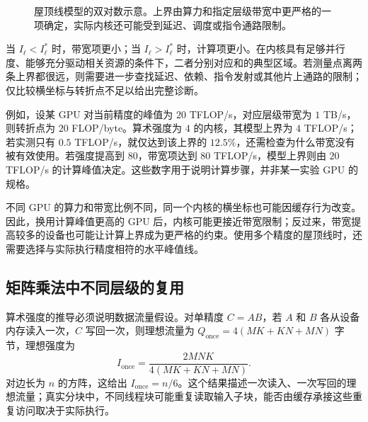 \begin{figure}[htbp]
\centering
{}
\caption{屋顶线模型的双对数示意。上界由算力和指定层级带宽中更严格的一项确定，实际内核还可能受到延迟、调度或指令通路限制。}
\label{l14:fig:roofline-model}
\end{figure}

当 $I_\ell<I_\ell^*$ 时，带宽项更小；当 $I_\ell>I_\ell^*$ 时，计算项更小。在内核具有足够并行度、能够充分驱动相关资源的条件下，二者分别对应和的典型区域。若测量点离两条上界都很远，则需要进一步查找延迟、依赖、指令发射或其他片上通路的限制；仅比较横坐标与转折点不足以给出完整诊断。

例如，设某 GPU 对当前精度的峰值为 $20$ TFLOP/s，对应层级带宽为 $1$ TB/s，则转折点为 $20$ FLOP/byte。算术强度为 $4$ 的内核，其模型上界为 $4$ TFLOP/s；若实测只有 $0.5$ TFLOP/s，就仅达到该上界的 $12.5\%$，还需检查为什么带宽没有被有效使用。若强度提高到 $80$，带宽项达到 $80$ TFLOP/s，模型上界则由 $20$ TFLOP/s 的计算峰值决定。这些数字用于说明计算步骤，并非某一实验 GPU 的规格。

不同 GPU 的算力和带宽比例不同，同一个内核的横坐标也可能因缓存行为改变。因此，换用计算峰值更高的 GPU 后，内核可能更接近带宽限制；反过来，带宽提高较多的设备也可能让计算上界成为更严格的约束。使用多个精度的屋顶线时，还需要选择与实际执行精度相符的水平峰值线。

\subsection{矩阵乘法中不同层级的复用}

算术强度的推导必须说明数据流量假设。对单精度 $C=AB$，若 $A$ 和 $B$ 各从设备内存读入一次，$C$ 写回一次，则理想流量为 $Q_{\mathrm{once}}=4(MK+KN+MN)$ 字节，理想强度为
\begin{equation}
 I_{\mathrm{once}}=\frac{2MNK}{4(MK+KN+MN)}.
 \label{l14:eq:gemm-ai}
\end{equation}
对边长为 $n$ 的方阵，这给出 $I_{\mathrm{once}}=n/6$。这个结果描述一次读入、一次写回的理想流量；真实分块中，不同线程块可能重复读取输入子块，能否由缓存承接这些重复访问取决于实际执行。

